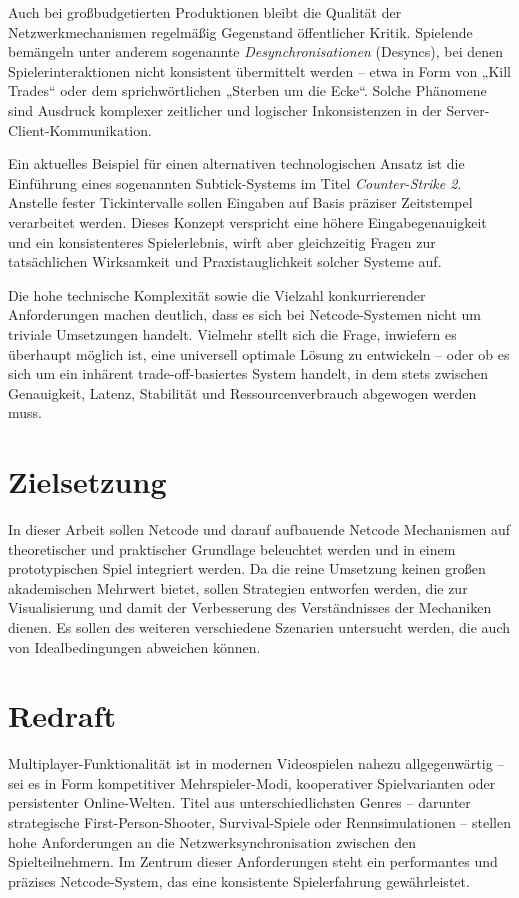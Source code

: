 Auch bei großbudgetierten Produktionen bleibt die Qualität der Netzwerkmechanismen regelmäßig Gegenstand öffentlicher Kritik. Spielende bemängeln unter anderem sogenannte \emph{Desynchronisationen} (Desyncs), bei denen Spielerinteraktionen nicht konsistent übermittelt werden – etwa in Form von „Kill Trades“ oder dem sprichwörtlichen „Sterben um die Ecke“. Solche Phänomene sind Ausdruck komplexer zeitlicher und logischer Inkonsistenzen in der Server-Client-Kommunikation.

Ein aktuelles Beispiel für einen alternativen technologischen Ansatz ist die Einführung eines sogenannten Subtick-Systems im Titel \emph{Counter-Strike 2}. Anstelle fester Tickintervalle sollen Eingaben auf Basis präziser Zeitstempel verarbeitet werden. Dieses Konzept verspricht eine höhere Eingabegenauigkeit und ein konsistenteres Spielerlebnis, wirft aber gleichzeitig Fragen zur tatsächlichen Wirksamkeit und Praxistauglichkeit solcher Systeme auf.

Die hohe technische Komplexität sowie die Vielzahl konkurrierender Anforderungen machen deutlich, dass es sich bei Netcode-Systemen nicht um triviale Umsetzungen handelt. Vielmehr stellt sich die Frage, inwiefern es überhaupt möglich ist, eine universell optimale Lösung zu entwickeln – oder ob es sich um ein inhärent trade-off-basiertes System handelt, in dem stets zwischen Genauigkeit, Latenz, Stabilität und Ressourcenverbrauch abgewogen werden muss.

\section{Zielsetzung}
In dieser Arbeit sollen Netcode und darauf aufbauende Netcode Mechanismen auf theoretischer und praktischer Grundlage beleuchtet werden und in einem prototypischen Spiel integriert werden.
Da die reine Umsetzung keinen großen akademischen Mehrwert bietet, sollen Strategien entworfen werden, die zur Visualisierung und damit der Verbesserung des Verständnisses der Mechaniken dienen.
Es sollen des weiteren verschiedene Szenarien untersucht werden, die auch von Idealbedingungen abweichen können.

\section{Redraft}

Multiplayer-Funktionalität ist in modernen Videospielen nahezu allgegenwärtig – sei es in Form kompetitiver Mehrspieler-Modi, kooperativer Spielvarianten oder persistenter Online-Welten. Titel aus unterschiedlichsten Genres – darunter strategische First-Person-Shooter, Survival-Spiele oder Rennsimulationen – stellen hohe Anforderungen an die Netzwerksynchronisation zwischen den Spielteilnehmern. Im Zentrum dieser Anforderungen steht ein performantes und präzises Netcode-System, das eine konsistente Spielerfahrung gewährleistet.

